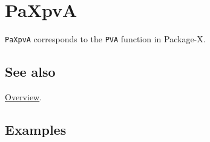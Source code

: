 \documentclass[../FeynHelpersManual.tex]{subfiles}
\begin{document}
\hypertarget{paxpva}{
\section{PaXpvA}\label{paxpva}}

\texttt{PaXpvA} corresponds to the \texttt{PVA} function in Package-X.

\subsection{See also}

\hyperlink{toc}{Overview}.

\subsection{Examples}
\end{document}
